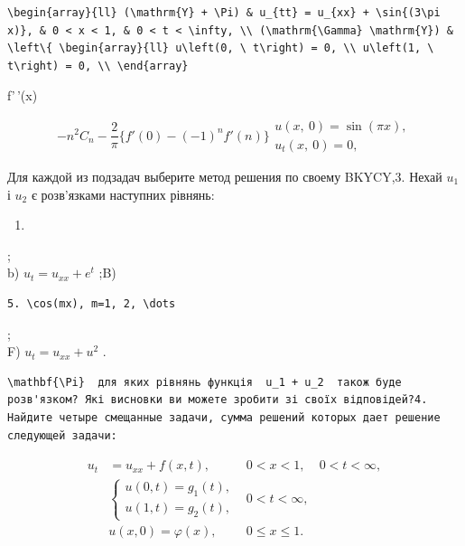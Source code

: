 \documentclass[
  ukrainian,
]{article}
\providecommand{\tightlist}{%
  \setlength{\itemsep}{0pt}\setlength{\parskip}{0pt}}
\begin{document}
\begin{verbatim}
\begin{array}{ll} (\mathrm{Y} + \Pi) & u_{tt} = u_{xx} + \sin{(3\pi x)}, & 0 < x < 1, & 0 < t < \infty, \\ (\mathrm{\Gamma} \mathrm{Y}) & \left\{ \begin{array}{ll} u\left(0, \ t\right) = 0, \\ u\left(1, \ t\right) = 0, \\ \end{array}
\end{verbatim}

f'\,'(x)

\[
-n^{2}C_{n} - \frac{2}{\pi} \{f'(0) - (-1)^{n} f'(n)\}
\begin{array}{ll} u\left(x, \ 0\right) = \sin{(\pi x)}, \\ u_{t}\left(x, \ 0\right) = 0, \end{array}
\]

Для каждой из подзадач выберите метод решения по своему BKYCY,3. Нехай
\(u_1\) і \(u_2\) є розв'язками наступних рівнянь:

\begin{enumerate}
\def\labelenumi{\alph{enumi})}
\tightlist
\item
\end{enumerate}

;\\
b) \(u_t = u_{xx} + e^t\) ;B)

\begin{verbatim}
5. \cos(mx), m=1, 2, \dots
\end{verbatim}

;\\
F) \(u_t = u_{xx} + u^2\) .

\begin{verbatim}
\mathbf{\Pi}  для яких рівнянь функція  u_1 + u_2  також буде розв'язком? Які висновки ви можете зробити зі своїх відповідей?4. Найдите четыре смещанные задачи, сумма решений которых дает решение следующей задачи:
\end{verbatim}

\[
\begin{aligned} u_t &= u_{xx} + f(x, t), & 0 < x < 1, & 0 < t < \infty, \\ & \begin{cases} u(0, t) = g_1(t), \\ u(1, t) = g_2(t), \end{cases} & 0 < t < \infty, \\ & u(x, 0) = \varphi(x), & 0 \le x \le 1. \end{aligned}
\]
\end{document}
